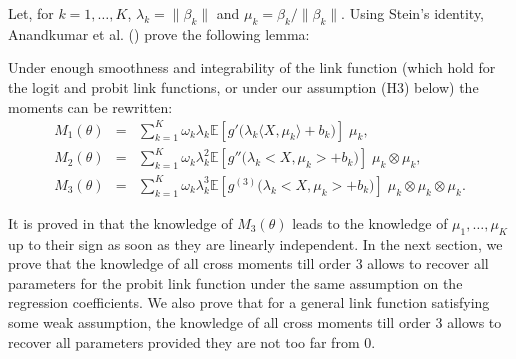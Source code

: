 \noindent
Let, for $k=1,\ldots,K$, $\lambda_k = \|\beta_k \| $ and $\mu_{k}=\beta_{k}/\|\beta_k \| $.
Using Stein's identity, Anandkumar et al. (\cite{AK2014b}) prove the following lemma: 
\begin{lemma}[\cite{AK2014b}]
\label{lem_rewrite}
%
Under enough smoothness and integrability of the link function (which hold for the logit and probit link functions, or under our assumption (H3) below) the moments can be rewritten:
\begin{eqnarray*}
		M_1(\theta)&=&\sum_{k=1}^K\omega_k\lambda_k\mathbb{E}[g'\big(\lambda_k\langle X,\mu_k\rangle+b_k\big)]\;\mu_k ,%
		\\
		M_2(\theta)&=&\sum_{k=1}^K\omega_k\lambda_k^2\mathbb{E}[g''\big(\lambda_k<X,\mu_k>+b_k\big)]\;\mu_k\otimes \mu_k ,%
		\\
		M_3(\theta)&=&\sum_{k=1}^K\omega_k\lambda_k^3\mathbb{E}[g^{(3)}\big(\lambda_k<X,\mu_k>+b_k\big)]\;\mu_k\otimes \mu_k\otimes \mu_k .%
\end{eqnarray*}
\end{lemma}
It is proved in \cite{AK2014b} that the knowledge of $M_{3}(\theta)$ leads to the knowledge of $\mu_{1},\ldots,\mu_{K}$ up to their sign as soon as they are linearly independent. In the next section, we prove that the  knowledge of all cross moments till order 3 allows to recover all parameters for the probit link function under the same assumption on the regression coefficients. We also prove that for a general link function satisfying some weak assumption,  the  knowledge of all cross moments till order 3 allows to recover all parameters provided they are not too far from $0$.


